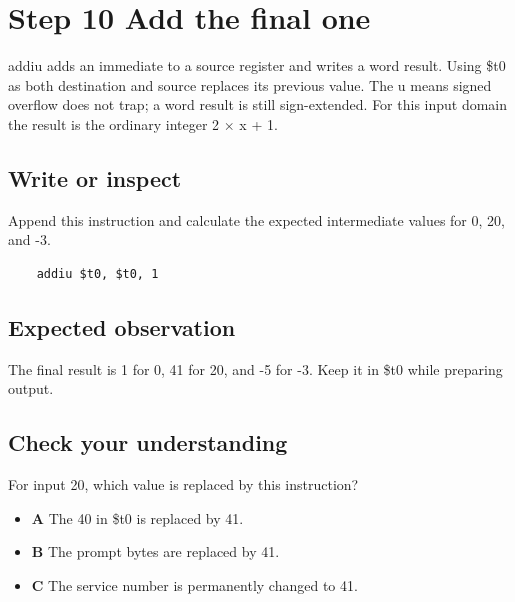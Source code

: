 \section{Step 10 Add the final
  one}\label{001-console-calculation-s10-step-10-add-the-final-one}

addiu adds an immediate to a source register and writes a word result.
Using \$t0 as both destination and source replaces its previous value.
The u means signed overflow does not trap; a word result is still
sign-extended. For this input domain the result is the ordinary integer
2 \ensuremath{\times} x + 1.

\subsection{Write or
  inspect}\label{001-console-calculation-s10-write-or-inspect}

Append this instruction and calculate the expected intermediate values
for 0, 20, and -3.

\begin{verbatim}
    addiu $t0, $t0, 1
\end{verbatim}

\subsection{Expected
  observation}\label{001-console-calculation-s10-expected-observation}

The final result is 1 for 0, 41 for 20, and -5 for -3. Keep it in \$t0
while preparing output.

\subsection{Check your
  understanding}\label{001-console-calculation-s10-check-your-understanding}

For input 20, which value is replaced by this instruction?

\begin{itemize}
  \tightlist
  \item
        \textbf{A} The 40 in \$t0 is replaced by 41.
  \item
        \textbf{B} The prompt bytes are replaced by 41.
  \item
        \textbf{C} The service number is permanently changed to 41.
\end{itemize}
